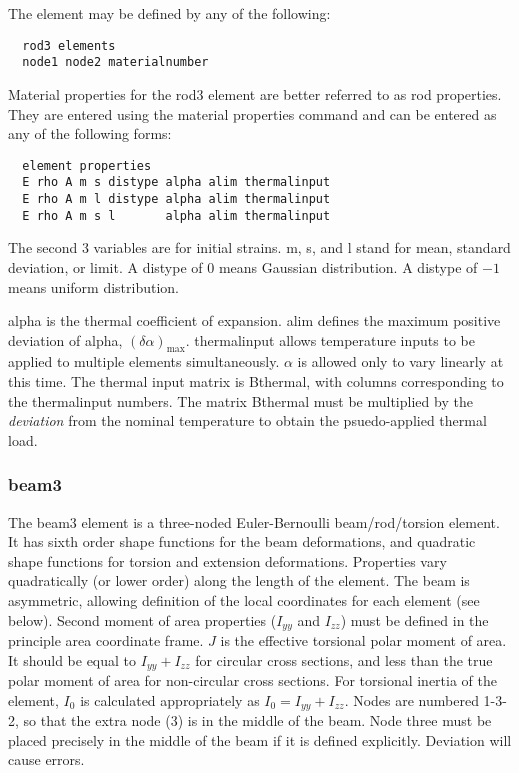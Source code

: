 \documentclass[12pt]{article}
\newcommand*{\command}[1]{\textsf{#1}}
\begin{document}
The element may be defined by any of the following:\\
\begin{lstlisting}
  rod3 elements 
  node1 node2 materialnumber
\end{lstlisting}

Material properties for the \command{rod3} element  are better referred to as rod
properties. They are entered using the material properties command and
can be entered as any of the following forms:
\begin{lstlisting}
  element properties
  E rho A m s distype alpha alim thermalinput
  E rho A m l distype alpha alim thermalinput
  E rho A m s l       alpha alim thermalinput
\end{lstlisting}
The second 3 variables are for initial strains. \command{m}, \command{s}, and \command{l}
stand for mean, standard deviation, or limit. A \command{distype} of $0$
means Gaussian distribution. A \command{distype} of $-1$ means uniform distribution. 

\command{alpha} is the thermal coefficient of expansion. \command{alim} defines the maximum positive deviation of \command{alpha}, $\left(\delta\alpha\right)_\text{max}$. \command{thermalinput} allows temperature inputs to be applied to multiple elements simultaneously. $\alpha$ is allowed only to vary linearly at this time.  The thermal input matrix is \command{Bthermal}, with columns corresponding to the \command{thermalinput} numbers. The matrix \command{Bthermal} must be multiplied by the \emph{deviation} from the nominal temperature to obtain the psuedo-applied thermal load. 


\subsubsection{\command{beam3}}\label{el:beam3}
The \command{beam3} element is a three-noded Euler-Bernoulli beam/rod/torsion element. It has sixth order shape functions for the beam deformations, and quadratic shape functions for torsion and extension deformations. Properties vary quadratically (or lower order) along the length of the element. The beam is asymmetric, allowing definition of the local coordinates for each element (see below). Second moment of area properties ($I_{yy}$ and $I_{zz}$) must be defined in the principle area coordinate frame. $J$ is the effective torsional polar moment of area. It should be equal to $I_{yy}+I_{zz}$ for circular cross sections, and less than the true polar moment of area for non-circular cross sections. For torsional inertia of the element, $I_0$ is calculated appropriately as $I_0=I_{yy}+I_{zz}$. Nodes are numbered 1-3-2, so that the extra node (3) is in the middle of the beam. Node three must be placed precisely in the middle of the beam if it is defined explicitly. Deviation will cause errors. 
\end{document}
